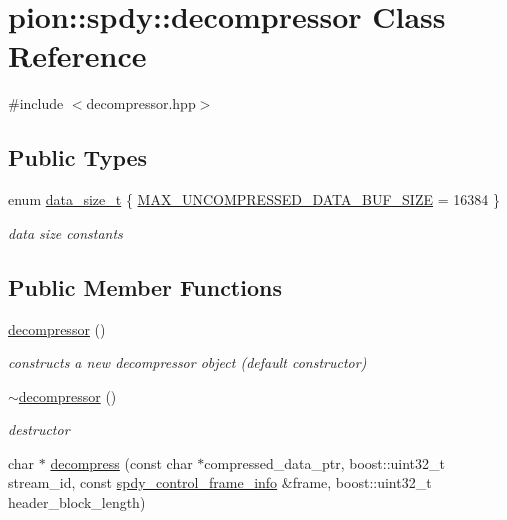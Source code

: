 \hypertarget{classpion_1_1spdy_1_1decompressor}{\section{pion\-:\-:spdy\-:\-:decompressor Class Reference}
\label{classpion_1_1spdy_1_1decompressor}
}


{\ttfamily \#include $<$decompressor.\-hpp$>$}

\subsection*{Public Types}
\begin{DoxyCompactItemize}
\item 
enum \hyperlink{classpion_1_1spdy_1_1decompressor_a9fb34f033b4d95e5f23fa9b0d03c4818}{data\-\_\-size\-\_\-t} \{ \hyperlink{classpion_1_1spdy_1_1decompressor_a9fb34f033b4d95e5f23fa9b0d03c4818a44ab53316cb7bd9c9d66621b6e537e08}{M\-A\-X\-\_\-\-U\-N\-C\-O\-M\-P\-R\-E\-S\-S\-E\-D\-\_\-\-D\-A\-T\-A\-\_\-\-B\-U\-F\-\_\-\-S\-I\-Z\-E} = 16384
 \}
\begin{DoxyCompactList}\small\item\em data size constants \end{DoxyCompactList}\end{DoxyCompactItemize}
\subsection*{Public Member Functions}
\begin{DoxyCompactItemize}
\item 
\hyperlink{classpion_1_1spdy_1_1decompressor_ab60b284101b5b7ffedc2fb4daab2f77d}{decompressor} ()
\begin{DoxyCompactList}\small\item\em constructs a new decompressor object (default constructor) \end{DoxyCompactList}\item 
\hyperlink{classpion_1_1spdy_1_1decompressor_adc518d8ec91bb78d58077f7fb661881f}{$\sim$decompressor} ()
\begin{DoxyCompactList}\small\item\em destructor \end{DoxyCompactList}\item 
char $\ast$ \hyperlink{classpion_1_1spdy_1_1decompressor_a9e6e8b557657365b9e30a501c9bdd00b}{decompress} (const char $\ast$compressed\-\_\-data\-\_\-ptr, boost\-::uint32\-\_\-t stream\-\_\-id, const \hyperlink{structpion_1_1spdy_1_1spdy__control__frame__info}{spdy\-\_\-control\-\_\-frame\-\_\-info} \&frame, boost\-::uint32\-\_\-t header\-\_\-block\-\_\-length)
\end{DoxyCompactItemize}
